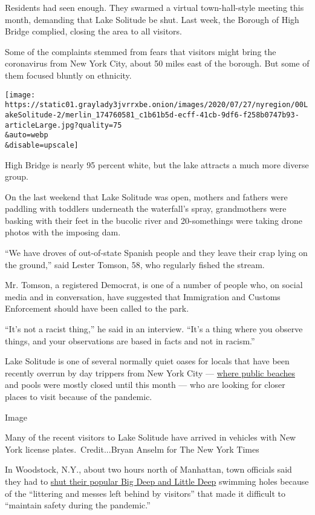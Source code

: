 Residents had seen enough. They swarmed a virtual town-hall-style
meeting this month, demanding that Lake Solitude be shut. Last week, the
Borough of High Bridge complied, closing the area to all visitors.

Some of the complaints stemmed from fears that visitors might bring the
coronavirus from New York City, about 50 miles east of the borough. But
some of them focused bluntly on ethnicity.

\texttt{[image: https://static01.graylady3jvrrxbe.onion/images/2020/07/27/nyregion/00LakeSolitude-2/merlin\_174760581\_c1b61b5d-ecff-41cb-9df6-f258b0747b93-articleLarge.jpg?quality=75\\\&auto=webp\\\&disable=upscale]}

High Bridge is nearly 95 percent white, but the lake attracts a much
more diverse group.

On the last weekend that Lake Solitude was open, mothers and fathers
were paddling with toddlers underneath the waterfall's spray,
grandmothers were basking with their feet in the bucolic river and
20-somethings were taking drone photos with the imposing dam.

``We have droves of out-of-state Spanish people and they leave their
crap lying on the ground,'' said Lester Tomson, 58, who regularly fished
the stream.

Mr. Tomson, a registered Democrat, is one of a number of people who, on
social media and in conversation, have suggested that Immigration and
Customs Enforcement should have been called to the park.

``It's not a racist thing,'' he said in an interview. ``It's a thing
where you observe things, and your observations are based in facts and
not in racism.''

Lake Solitude is one of several normally quiet oases for locals that
have been recently overrun by day trippers from New York City ---
\href{https://www.nytimes3xbfgragh.onion/2020/07/03/nyregion/beaches-open-nyc.html}{where
public beaches} and pools were mostly closed until this month --- who
are looking for closer places to visit because of the pandemic.

Image

Many of the recent visitors to Lake Solitude have arrived in vehicles
with New York license plates.~Credit...Bryan Anselm for The New York
Times

In Woodstock, N.Y., about two hours north of Manhattan, town officials
said they had to
\href{https://hudsonvalleyone.com/2020/07/08/woodstock-cracks-down-use-of-closed-swimming-holes/}{shut
their popular Big Deep and Little Deep} swimming holes because of the
``littering and messes left behind by visitors'' that made it difficult
to ``maintain safety during the pandemic.''

